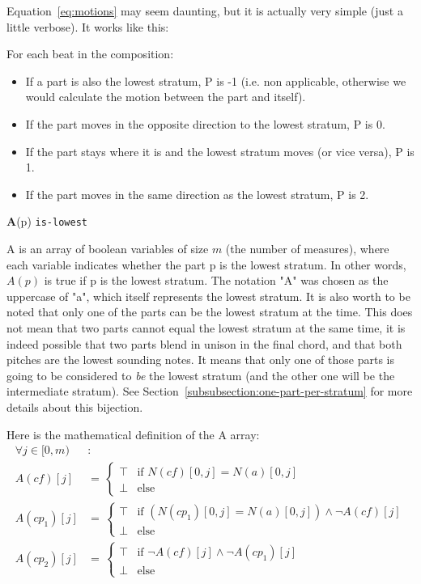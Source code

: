 Equation~\ref{eq:motions} may seem daunting, but it is actually very simple (just a little verbose).
It works like this: 

For each beat in the composition:
\begin{itemize}
    \item If a part is also the lowest stratum, P is -1 (i.e. non applicable, otherwise we would calculate the motion between the part and itself).
    \item If the part moves in the opposite direction to the lowest stratum, P is 0.
    \item If the part stays where it is and the lowest stratum moves (or vice versa), P is 1.
    \item If the part moves in the same direction as the lowest stratum, P is 2.
\end{itemize}

\vspace{.5cm} \noindent \textbf{A}(p) \hspace{.cm} \texttt{is-lowest} \label{is-lowest}

A is an array of boolean variables of size $m$ (the number of measures), where each variable indicates whether the part p is the lowest stratum. In other words, $A(p)$ is true if p is the lowest stratum. The notation "A" was chosen as the uppercase of "a", which itself represents the lowest stratum. 
It is also worth to be noted that only one of the parts can be the lowest stratum at the time. This does not mean that two parts cannot equal the lowest stratum at the same time, it is indeed possible that two parts blend in unison in the final chord, and that both pitches are the lowest sounding notes. It means that only one of those parts is going to be considered to \textit{be} the lowest stratum (and the other one will be the intermediate stratum). See Section~\ref{subsubsection:one-part-per-stratum} for more details about this bijection.

Here is the mathematical definition of the A array:
\begin{equation}
\begin{aligned}
\forall j \in [0, m)& \colon  \\
A(\mathit{cf})[j] &= \,  
\begin{cases}
    \top & \text{if } N(cf)[0,j] = N(a)[0,j] \\
    \bot & \text{else }
\end{cases}\\
A(cp_1)[j] &= \,  
\begin{cases}
    \top & \text{if } (N(cp_1)[0,j] = N(a)[0,j]) \land \neg A(\mathit{cf})[j] \\
    \bot & \text{else }
\end{cases}\\
A(cp_2)[j] &= \,  
\begin{cases}
    \top & \text{if } \neg A(\mathit{cf})[j] \land \neg A(cp_1)[j]\\
    \bot & \text{else }
\end{cases}
\end{aligned}
\end{equation}

